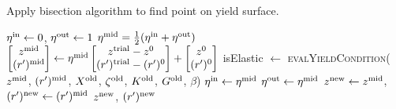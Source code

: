 \begin{breakablealgorithm}
\caption{Apply bisection algorithm to find point on yield surface.}
\begin{algorithmic}[1]
    \State $\eta^{\text{in}} \leftarrow 0$, $\eta^{\text{out}} \leftarrow 1$
      \State $\eta^{\text{mid}} = \tfrac{1}{2} (\eta^{\text{in}} + \eta^{\text{out}})$
      \State $\begin{bmatrix} z^{\text{mid}} \\ (r')^{\text{mid}} \end{bmatrix}
         \leftarrow \eta^{\text{mid}} \begin{bmatrix} z^{\text{trial}} - z^0\\ (r')^{\text{trial}} - (r')^0 \end{bmatrix} + 
         \begin{bmatrix} z^0 \\ (r')^0 \end{bmatrix}$
      \State isElastic $\leftarrow$ \textsc{evalYieldCondition}($z^{\text{mid}}$, $(r')^{\text{mid}}$, $X^{\text{old}}$, 
                                                                $\zeta^{\text{old}}$, $K^{\text{old}}$, $G^{\text{old}}$,
                                                                $\beta$)
         \State $\eta^{\text{in}} \leftarrow \eta^{\text{mid}}$
      \Else
         \State $\eta^{\text{out}} \leftarrow \eta^{\text{mid}}$
      \EndIf
    \EndWhile
    \State $z^{\text{new}} \leftarrow z^{\text{mid}}$, $(r')^{\text{new}} \leftarrow (r')^{\text{mid}}$ 
    \State \Return $z^{\text{new}}$, $(r')^{\text{new}}$
  \EndProcedure
\end{algorithmic}
\end{breakablealgorithm}

